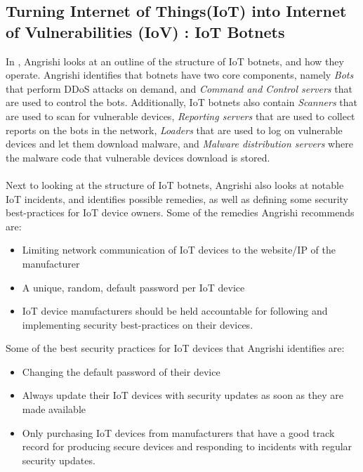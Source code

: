 \documentclass[a4paper,10pt]{article}
\begin{document}
\subsection{Turning Internet of Things(IoT) into Internet of Vulnerabilities (IoV) : IoT Botnets} \label{sec:literature_review:angrishi2017}
In \cite{angrishi2017turning}, Angrishi looks at an outline of the structure of IoT botnets, and how they operate. Angrishi
identifies that botnets have two core components, namely \textit{Bots} that perform DDoS attacks on demand, and
\textit{Command and Control servers} that are used to control the bots. Additionally, IoT botnets also contain 
\textit{Scanners} that are used to scan for vulnerable devices, \textit{Reporting servers} that are used to collect reports
on the bots in the network, \textit{Loaders} that are used to log on vulnerable devices and let them download malware,
and \textit{Malware distribution servers} where the malware code that vulnerable devices download is stored.
\\\\
Next to looking at the structure of IoT botnets, Angrishi also looks at notable IoT incidents, and identifies possible
remedies, as well as defining some security best-practices for IoT device owners.  Some of the remedies Angrishi 
recommends are:
\begin{itemize}
 \item Limiting network communication of IoT devices to the website/IP of the manufacturer
 \item A unique, random, default password per IoT device
 \item IoT device manufacturers should be held accountable for following and implementing security best-practices
 on their devices.
\end{itemize}

Some of the best security practices for IoT devices that Angrishi identifies are:
\begin{itemize}
 \item Changing the default password of their device
 \item Always update their IoT devices with security updates as soon as they are made available
 \item Only purchasing IoT devices from manufacturers that have a good track record for producing secure
 devices and responding to incidents with regular security updates.
\end{itemize}
\end{document}
